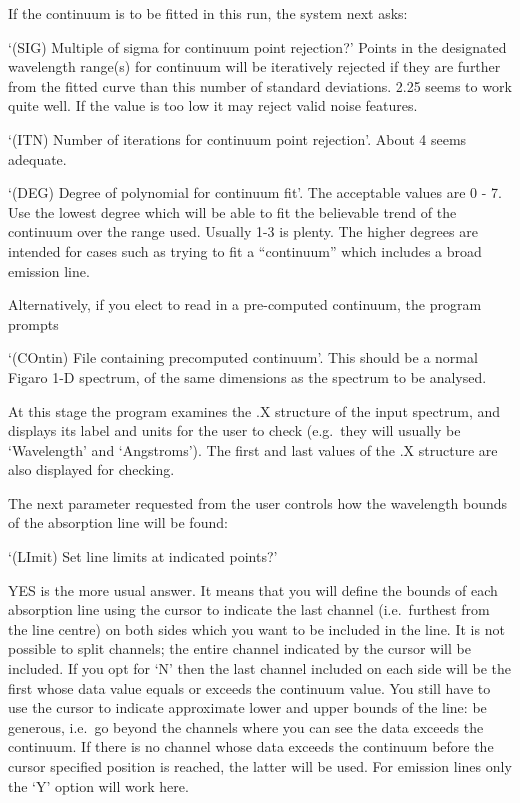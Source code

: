 If the continuum is to be fitted in this run, the system next asks:

`(SIG) Multiple of sigma for continuum point rejection?'  Points in the 
designated
wavelength range(s) for continuum will be iteratively rejected if they are
further from the fitted curve than this number of standard deviations. 2.25
seems to work quite well. If the value is too low it may reject valid noise
features. 

`(ITN) Number of iterations for continuum point rejection'. About 4 seems 
adequate.

`(DEG) Degree of polynomial for continuum fit'. The acceptable values 
are 0 - 7. Use
the lowest degree which will be able to fit the believable trend of the
continuum over the range used. Usually 1-3 is plenty. The higher degrees are
intended for cases such as trying to fit a ``continuum'' which includes a broad
emission line. 

Alternatively, if you elect to read in a pre-computed continuum, the program
prompts 

`(COntin) File containing precomputed continuum'.  This should be a normal
Figaro 1-D spectrum, of the same dimensions as the spectrum to be analysed.

At this stage the program examines the .X structure of the input 
spectrum, and displays its label and units for the user to check (e.g.\ 
they will usually be `Wavelength' and `Angstroms'). The first and last 
values of the .X structure are also displayed for checking.

The next parameter requested from the user controls how the wavelength 
bounds of the absorption line will be found:

`(LImit) Set line limits at indicated points?'

YES is the more usual answer.  It means that you will define the 
bounds of each absorption line using the cursor to indicate the last 
channel (i.e.\ furthest from the line centre) on both sides which you want 
to be included in the line. It is not possible to split channels; the 
entire channel indicated by the cursor will be included. If you opt for `N' 
then the last channel included on each side will be the first whose data 
value equals or exceeds the continuum value. You still have to use the 
cursor to indicate approximate lower and upper bounds of the line: be 
generous, i.e.\ go beyond the channels where you can see the data exceeds 
the continuum. If there is no channel whose data exceeds the continuum 
before the cursor specified position is reached, the latter will be used. 
For emission lines only the `Y' option will work here.

